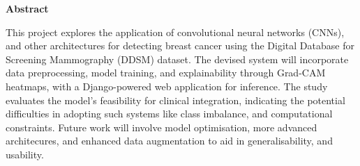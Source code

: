 \thispagestyle{plain}
\makeatletter
\begin{center}
    \Large
    \textbf{\@title}
        
    \vspace{0.4cm}
    \large
    \projectSubtitle
        
    \vspace{0.4cm}
    \textbf{\@author}
       
    \vspace{0.9cm}
    \textbf{Abstract}
\end{center}
\makeatother

This project explores the application of convolutional neural networks (CNNs), and other architectures for detecting breast cancer using the Digital Database for Screening Mammography (DDSM) dataset. The devised system will incorporate data preprocessing, model training, and explainability through Grad-CAM heatmaps, with a Django-powered web application for inference. The study evaluates the model's feasibility for clinical integration, indicating the potential difficulties in adopting such systems like class imbalance, and computational constraints. Future work will involve model optimisation, more advanced architecures, and enhanced data augmentation to aid in generalisability, and usability.
